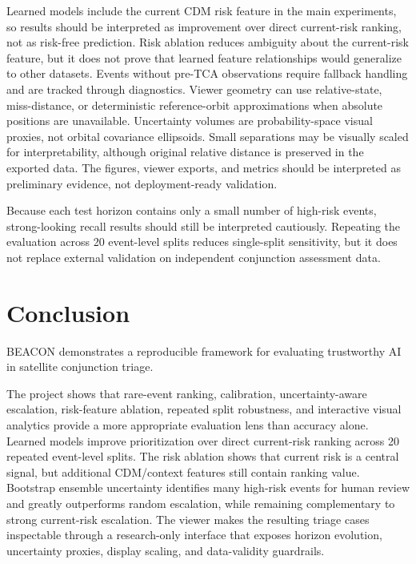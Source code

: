 \documentclass[11pt]{article}
\begin{document}
Learned models include the current CDM risk feature in the main experiments, so results should be interpreted as improvement over direct current-risk ranking, not as risk-free prediction. Risk ablation reduces ambiguity about the current-risk feature, but it does not prove that learned feature relationships would generalize to other datasets. Events without pre-TCA observations require fallback handling and are tracked through diagnostics. Viewer geometry can use relative-state, miss-distance, or deterministic reference-orbit approximations when absolute positions are unavailable. Uncertainty volumes are probability-space visual proxies, not orbital covariance ellipsoids. Small separations may be visually scaled for interpretability, although original relative distance is preserved in the exported data. The figures, viewer exports, and metrics should be interpreted as preliminary evidence, not deployment-ready validation.

Because each test horizon contains only a small number of high-risk events, strong-looking recall results should still be interpreted cautiously. Repeating the evaluation across 20 event-level splits reduces single-split sensitivity, but it does not replace external validation on independent conjunction assessment data.

\section{Conclusion}

BEACON demonstrates a reproducible framework for evaluating trustworthy AI in satellite conjunction triage.

The project shows that rare-event ranking, calibration, uncertainty-aware escalation, risk-feature ablation, repeated split robustness, and interactive visual analytics provide a more appropriate evaluation lens than accuracy alone. Learned models improve prioritization over direct current-risk ranking across 20 repeated event-level splits. The risk ablation shows that current risk is a central signal, but additional CDM/context features still contain ranking value. Bootstrap ensemble uncertainty identifies many high-risk events for human review and greatly outperforms random escalation, while remaining complementary to strong current-risk escalation. The viewer makes the resulting triage cases inspectable through a research-only interface that exposes horizon evolution, uncertainty proxies, display scaling, and data-validity guardrails.
\end{document}
